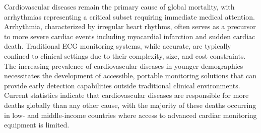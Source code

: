 \documentclass[12pt,a4paper]{article}
\begin{document}
Cardiovascular diseases remain the primary cause of global mortality, with arrhythmias representing a critical subset requiring immediate medical attention. Arrhythmia, characterized by irregular heart rhythms, often serves as a precursor to more severe cardiac events including myocardial infarction and sudden cardiac death. Traditional ECG monitoring systems, while accurate, are typically confined to clinical settings due to their complexity, size, and cost constraints.
The increasing prevalence of cardiovascular diseases in younger demographics necessitates the development of accessible, portable monitoring solutions that can provide early detection capabilities outside traditional clinical environments. Current statistics indicate that cardiovascular diseases are responsible for more deaths globally than any other cause, with the majority of these deaths occurring in low- and middle-income countries where access to advanced cardiac monitoring equipment is limited.
\newpage
\end{document}
